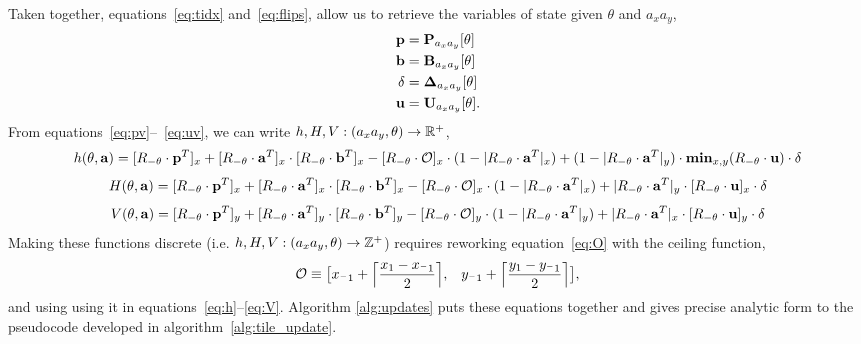 Taken together, equations~\ref{eq:tidx} and~\ref{eq:flips}, allow us to retrieve the variables
 of state given $\theta$ and $a_xa_y$,
\begin{eqnarray}
    \mathbf{p} &= \mathbf{P}_{a_xa_y}[\theta] \label{eq:pv} \\
    \mathbf{b} &= \mathbf{B}_{a_xa_y}[\theta]\\
    \delta &= \mathbf{\Delta}_{a_xa_y}[\theta]\\
    \mathbf{u} &= \mathbf{U}_{a_xa_y}[\theta]. \label{eq:uv}
\end{eqnarray}
From equations~\ref{eq:pv}--~\ref{eq:uv}, we can write $h,H,V: (a_xa_y,\theta) \rightarrow \mathbb{R}^+$,
\begin{equation}
    h(\theta,\av) = [\rnt \cdot \pv^T]_x + [\rnt \cdot \av^T]_x \cdot [\rnt \cdot \bv^T]_x -
    [\rnt \cdot \orig]_x \cdot (1 - |\rnt \cdot \av^T|_x) +
    (1 - |\rnt \cdot \av^T|_y) \cdot \mathbf{min}_{x,y}(\rnt \cdot \uv ) \cdot \delta
    \label{eq:h}
\end{equation}
\begin{equation}
    H(\theta,\av) = [\rnt \cdot \pv^T]_x + [\rnt \cdot \av^T]_x \cdot [\rnt \cdot \bv^T]_x -
    [\rnt \cdot \orig]_x \cdot (1 - |\rnt \cdot \av^T|_x) +
    |\rnt \cdot \av^T|_y \cdot [\rnt \cdot \uv ]_x \cdot \delta
    \label{eq:H}
\end{equation}
\begin{equation}
    V(\theta,\av) = [\rnt \cdot \pv^T]_y + [\rnt \cdot \av^T]_y \cdot [\rnt \cdot \bv^T]_y -
    [\rnt \cdot \orig]_y \cdot (1 - |\rnt \cdot \av^T|_y) +
    |\rnt \cdot \av^T|_x \cdot [\rnt \cdot \uv ]_y \cdot \delta
    \label{eq:V}
\end{equation}
Making these functions discrete (i.e. $h,H,V: (a_xa_y,\theta) \rightarrow \mathbb{Z}^+$)
requires reworking equation~\ref{eq:O} with the ceiling function,
\begin{equation}
    \mathcal{O} \equiv \bigl[x_{^-1} + \ceil[\Big]{\frac{x_1 - x_{^-1}}{2}}, \;\;\;
                             y_{^-1} + \ceil[\Big]{\frac{y_1 - y_{^-1}}{2}} \bigl],
    \label{eq:discreteO}
\end{equation}
and using using it in equations~\eqref{eq:h}--\eqref{eq:V}.  Algorithm \ref{alg:updates}
puts these equations together and gives precise analytic form to
the pseudocode developed in algorithm~\ref{alg:tile_update}.


